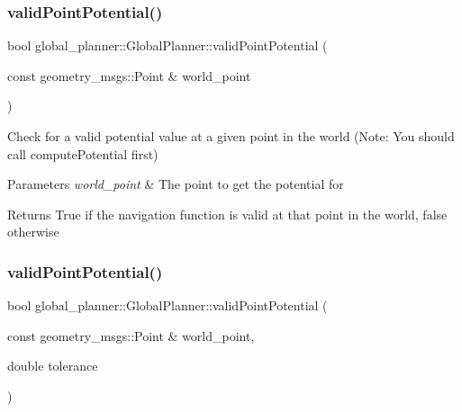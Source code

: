 \subsubsection{\texorpdfstring{valid\+Point\+Potential()}{validPointPotential()}\hspace{0.1cm}{\footnotesize\ttfamily [1/2]}}
{\footnotesize\ttfamily bool global\+\_\+planner\+::\+Global\+Planner\+::valid\+Point\+Potential (\begin{DoxyParamCaption}\item[{const geometry\+\_\+msgs\+::\+Point \&}]{world\+\_\+point }\end{DoxyParamCaption})}



Check for a valid potential value at a given point in the world (Note\+: You should call compute\+Potential first) 


\begin{DoxyParams}{Parameters}
{\em world\+\_\+point} & The point to get the potential for \\
\hline
\end{DoxyParams}
\begin{DoxyReturn}{Returns}
True if the navigation function is valid at that point in the world, false otherwise 
\end{DoxyReturn}
\mbox{\label{classglobal__planner_1_1_global_planner_a27405d9450075e6dcc7fc73bd56fb6dc}} 
\subsubsection{\texorpdfstring{valid\+Point\+Potential()}{validPointPotential()}\hspace{0.1cm}{\footnotesize\ttfamily [2/2]}}
{\footnotesize\ttfamily bool global\+\_\+planner\+::\+Global\+Planner\+::valid\+Point\+Potential (\begin{DoxyParamCaption}\item[{const geometry\+\_\+msgs\+::\+Point \&}]{world\+\_\+point,  }\item[{double}]{tolerance }\end{DoxyParamCaption})}



